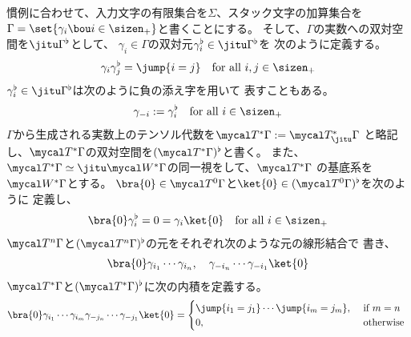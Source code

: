 {	慣例に合わせて、入力文字の有限集合を$\Sigma$、スタック文字の加算集合を
	$\Gamma=\set{\gamma_i\bou i\in\sizen_+}$と書くことにする。
	そして、$\Gamma$の実数への双対空間を$\jitu\Gamma^\flat$として、
	$\gamma_i\in\Gamma$の双対元$\gamma_i^\flat\in\jitu\Gamma^\flat$を
	次のように定義する。
	\begin{equation}\label{eq:スタック文字の交換関係}\begin{split}
		\gamma_i\gamma_j^\flat = \jump{i=j} \quad\text{for all } i,j\in\sizen_+
	\end{split}\end{equation}
	$\gamma_i^\flat\in\jitu\Gamma^\flat$は次のように負の添え字を用いて
	表すこともある。
	\begin{equation*}\begin{split}
		\gamma_{-i} := \gamma_i^\flat \quad\text{for all } i\in\sizen_+
	\end{split}\end{equation*}
	$\Gamma$から生成される実数上のテンソル代数を$\T^*\Gamma:=\T_\jitu^*\Gamma$
	と略記し、$\T^*\Gamma$の双対空間を$(\T^*\Gamma)^\flat$と書く。
	また、$\T^*\Gamma\simeq\jitu\W^*\Gamma$の同一視をして、$\T^*\Gamma$
	の基底系を$\W^*\Gamma$とする。
	$\bra{0}\in\T^0\Gamma$と$\ket{0}\in(\T^0\Gamma)^\flat$を次のように
	定義し、
	\begin{equation*}\begin{split}
		\bra{0}\gamma_i^\flat = 0 = \gamma_i\ket{0}
		\quad\text{for all } i\in\sizen_+
	\end{split}\end{equation*}
	$\T^n\Gamma$と$(\T^n\Gamma)^\flat$の元をそれぞれ次のような元の線形結合で
	書き、
	\begin{equation*}\begin{split}
		\bra{0}\gamma_{i_1}\cdots\gamma_{i_n}
		,\quad \gamma_{-i_n}\cdots\gamma_{-i_1}\ket{0}
	\end{split}\end{equation*}
	$\T^*\Gamma$と$(\T^*\Gamma)^\flat$に次の内積を定義する。
	\begin{equation*}\begin{split}
		\bra{0}\gamma_{i_1}\cdots\gamma_{i_m}
		\gamma_{-j_n}\cdots\gamma_{-j_1}\ket{0}
		= \begin{cases}
			\jump{i_1=j_1}\cdots\jump{i_m=j_m}, &\text{ if } m = n \\
			0, &\text{ otherwise } \\
		\end{cases}
	\end{split}\end{equation*}
}

